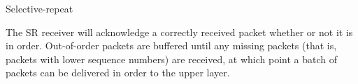 \begin{frame}
  \begin{block}{Selective-repeat}
    \begin{center}
       
    \end{center}
  \end{block}
\end{frame}

The SR receiver will acknowledge a correctly received packet whether or not it is in
order. Out-of-order packets are buffered until any missing packets (that is, packets with
lower sequence numbers) are received, at which point a batch of packets can be delivered
in order to the upper layer. 


